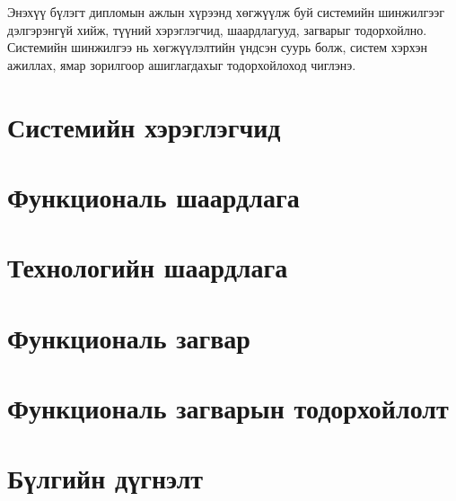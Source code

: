 Энэхүү бүлэгт дипломын ажлын хүрээнд хөгжүүлж буй системийн шинжилгээг дэлгэрэнгүй хийж, 
түүний хэрэглэгчид, шаардлагууд, загварыг тодорхойлно. Системийн шинжилгээ нь хөгжүүлэлтийн 
үндсэн суурь болж, систем хэрхэн ажиллах, ямар зорилгоор ашиглагдахыг тодорхойлоход чиглэнэ. 

\section{Системийн хэрэглэгчид}


\section{Функциональ шаардлага}


\section{Технологийн шаардлага}


\section{Функциональ загвар}


\section{Функциональ загварын тодорхойлолт}



\section{Бүлгийн дүгнэлт}
